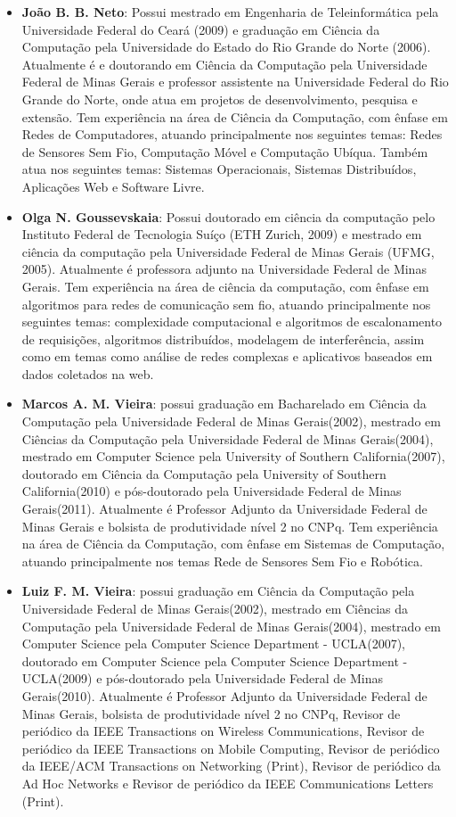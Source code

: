 \documentclass{SBCbookchapter}
\begin{document}
\begin{itemize}
\item \textbf{João B. B. Neto}: Possui mestrado em Engenharia de Teleinformática 
pela Universidade Federal do Ceará (2009) e graduação em Ciência da Computação 
pela Universidade do Estado do Rio Grande do Norte (2006). Atualmente é e 
doutorando em Ciência da Computação pela Universidade Federal de Minas Gerais e 
professor assistente na Universidade Federal do Rio Grande do Norte, onde atua 
em projetos de desenvolvimento, pesquisa e extensão. Tem experiência na área de 
Ciência da Computação, com ênfase em Redes de Computadores, atuando 
principalmente nos seguintes temas: Redes de Sensores Sem Fio, Computação Móvel 
e Computação Ubíqua. Também atua nos seguintes temas: Sistemas Operacionais, 
Sistemas Distribuídos, Aplicações Web e Software Livre.

\item \textbf{Olga N. Goussevskaia}: Possui doutorado em ciência da 
computação pelo Instituto Federal de Tecnologia Suíço (ETH Zurich, 2009) e 
mestrado em ciência da computação pela Universidade Federal de Minas Gerais 
(UFMG, 2005). Atualmente é professora adjunto na Universidade Federal de Minas 
Gerais. Tem experiência na área de ciência da computação, com ênfase em 
algoritmos para redes de comunicação sem fio, atuando principalmente nos 
seguintes temas: complexidade computacional e algoritmos de escalonamento de 
requisições, algoritmos distribuídos, modelagem de interferência, assim como em 
temas como análise de redes complexas e aplicativos baseados em dados coletados 
na web.

\item \textbf{Marcos A. M. Vieira}: possui graduação em Bacharelado em Ciência 
da Computação pela Universidade Federal de Minas Gerais(2002), mestrado em 
Ciências da Computação pela Universidade Federal de Minas Gerais(2004), mestrado 
em Computer Science pela University of Southern California(2007), doutorado em 
Ciência da Computação pela University of Southern California(2010) e 
pós-doutorado pela Universidade Federal de Minas Gerais(2011). Atualmente é 
Professor Adjunto da Universidade Federal de Minas Gerais e bolsista de 
produtividade nível 2 no CNPq. Tem experiência na área de Ciência da Computação, 
com ênfase em Sistemas de Computação, atuando principalmente nos temas Rede de 
Sensores Sem Fio e Robótica.

\item \textbf{Luiz F. M. Vieira}: possui graduação em Ciência da Computação 
pela Universidade Federal de Minas Gerais(2002), mestrado em Ciências da 
Computação pela Universidade Federal de Minas Gerais(2004), mestrado em Computer 
Science pela Computer Science Department - UCLA(2007), doutorado em Computer 
Science pela Computer Science Department - UCLA(2009) e pós-doutorado pela 
Universidade Federal de Minas Gerais(2010). Atualmente é Professor Adjunto da 
Universidade Federal de Minas Gerais, bolsista de produtividade nível 2 no CNPq, 
Revisor de periódico da IEEE Transactions on Wireless Communications, Revisor de 
periódico da IEEE Transactions on Mobile Computing, Revisor de periódico da 
IEEE/ACM Transactions on Networking (Print), Revisor de periódico da Ad Hoc 
Networks e Revisor de periódico da IEEE Communications Letters (Print).


\end{itemize}
\end{document}
